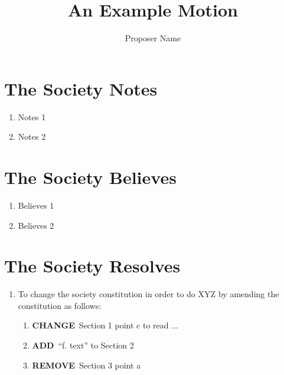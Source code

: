 \documentclass[a4paper,10pt]{article}
\title{An Example Motion}
\author{Proposer Name}
\date{}
\newcommand{\change}{\textbf{CHANGE}\ }
\newcommand{\add}{\textbf{ADD}\ }
\newcommand{\remove}{\textbf{REMOVE}\ }
\begin{document}
\maketitle

\section*{The Society Notes}
\begin{enumerate}
  \item Notes 1
  \item Notes 2
\end{enumerate}

\section*{The Society Believes}
\begin{enumerate}
  \item Believes 1
  \item Believes 2
\end{enumerate}

\section*{The Society Resolves}
\begin{enumerate}
  \item To change the society constitution in order to do XYZ by amending the constitution as follows:
  \begin{enumerate}
    \item \change Section 1 point c to read ...
    \item \add ``f. text'' to Section 2
    \item \remove Section 3 point a
  \end{enumerate}
\end{enumerate}
\end{document}

